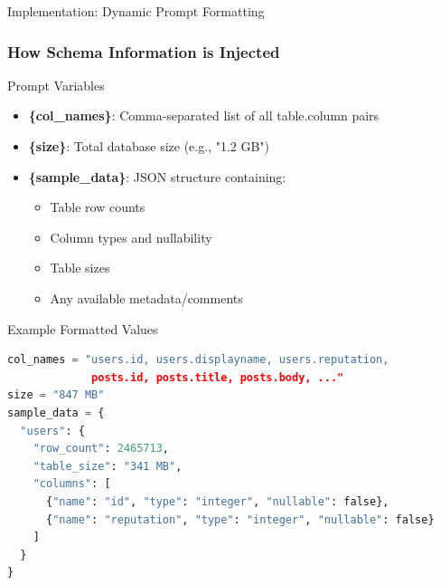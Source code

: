 \documentclass[smaller]{beamer}
\begin{document}
\begin{frame}[fragile]{Implementation: Dynamic Prompt Formatting}
\frametitle{How Schema Information is Injected}

\begin{block}{Prompt Variables}
\begin{itemize}
    \item \textbf{\{col\_names\}}: Comma-separated list of all table.column pairs
    \item \textbf{\{size\}}: Total database size (e.g., "1.2 GB")
    \item \textbf{\{sample\_data\}}: JSON structure containing:
    \begin{itemize}
        \item Table row counts
        \item Column types and nullability
        \item Table sizes
        \item Any available metadata/comments
    \end{itemize}
\end{itemize}
\end{block}

\begin{exampleblock}{Example Formatted Values}
\begin{lstlisting}[language=Python, basicstyle=\tiny\ttfamily]
col_names = "users.id, users.displayname, users.reputation, 
             posts.id, posts.title, posts.body, ..."
size = "847 MB"
sample_data = {
  "users": {
    "row_count": 2465713,
    "table_size": "341 MB",
    "columns": [
      {"name": "id", "type": "integer", "nullable": false},
      {"name": "reputation", "type": "integer", "nullable": false}
    ]
  }
}
\end{lstlisting}
\end{exampleblock}

\end{frame}
\end{document}
